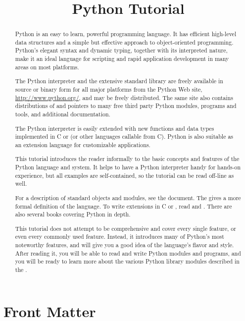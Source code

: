 \documentclass{manual}
\title{Python Tutorial}
\begin{document}
\maketitle

\ifhtml
\chapter*{Front Matter\label{front}}
\fi



\begin{abstract}

\noindent
Python is an easy to learn, powerful programming language.  It has
efficient high-level data structures and a simple but effective
approach to object-oriented programming.  Python's elegant syntax and
dynamic typing, together with its interpreted nature, make it an ideal 
language for scripting and rapid application development in many areas 
on most platforms.

The Python interpreter and the extensive standard library are freely
available in source or binary form for all major platforms from the
Python Web site, \url{http://www.python.org/}, and may be freely
distributed.  The same site also contains distributions of and
pointers to many free third party Python modules, programs and tools,
and additional documentation.

The Python interpreter is easily extended with new functions and data
types implemented in C or \Cpp{} (or other languages callable from C).
Python is also suitable as an extension language for customizable
applications.

This tutorial introduces the reader informally to the basic concepts
and features of the Python language and system.  It helps to have a
Python interpreter handy for hands-on experience, but all examples are
self-contained, so the tutorial can be read off-line as well.

For a description of standard objects and modules, see the
 document.  The
 gives a more
formal definition of the language.  To write extensions in C or
\Cpp, read  and .  There are also several books covering Python in depth.

This tutorial does not attempt to be comprehensive and cover every
single feature, or even every commonly used feature.  Instead, it
introduces many of Python's most noteworthy features, and will give
you a good idea of the language's flavor and style.  After reading it,
you will be able to read and write Python modules and programs, and
you will be ready to learn more about the various Python library
modules described in the .

\end{abstract}
\end{document}

